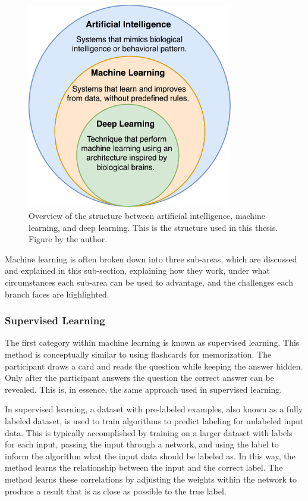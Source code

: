     \begin{figure}[htb]
        \centering
        \includegraphics[width=9cm]{images/ai_ml_dnn.png}
        \caption[Overview of the structure between artificial intelligence, machine learning, and deep learning. This is the structure used in this thesis.]{Overview of the structure between artificial intelligence, machine learning, and deep learning. This is the structure used in this thesis. Figure by the author.}
        \label{fig:ai_ml_dnn}
    \end{figure} 

    Machine learning is often broken down into three sub-areas, which are discussed and explained in this sub-section, explaining how they work, under what circumstances each sub-area can be used to advantage, and the challenges each branch faces are highlighted.

        \subsubsection{Supervised Learning}

        The first category within machine learning is known as supervised learning. This method is conceptually similar to using flashcards for memorization.
        The participant draws a card and reads the question while keeping the answer hidden. Only after the participant answers the question the correct answer can be revealed. This is, in essence, the same approach used in supervised learning.
        
        
        In supervised learning, a dataset with pre-labeled examples, also known as a fully labeled dataset, is used to train algorithms to predict labeling for unlabeled input data. This is typically accomplished by training on a larger dataset with labels for each input, passing the input through a network, and using the label to inform the algorithm what the input data should be labeled as. In this way, the method learns the relationship between the input and the correct label. The method learns these correlations by adjusting the weights within the network to produce a result that is as close as possible to the true label.
        
